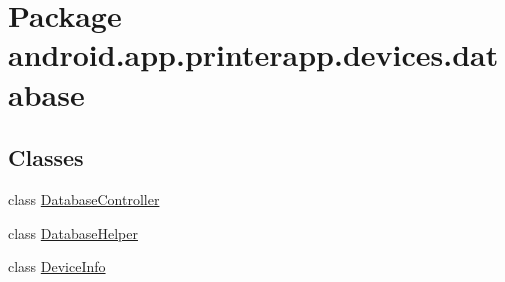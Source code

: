 \hypertarget{namespaceandroid_1_1app_1_1printerapp_1_1devices_1_1database}{}\section{Package android.\+app.\+printerapp.\+devices.\+database}
\label{namespaceandroid_1_1app_1_1printerapp_1_1devices_1_1database}
\subsection*{Classes}
\begin{DoxyCompactItemize}
\item 
class \hyperlink{classandroid_1_1app_1_1printerapp_1_1devices_1_1database_1_1_database_controller}{Database\+Controller}
\item 
class \hyperlink{classandroid_1_1app_1_1printerapp_1_1devices_1_1database_1_1_database_helper}{Database\+Helper}
\item 
class \hyperlink{classandroid_1_1app_1_1printerapp_1_1devices_1_1database_1_1_device_info}{Device\+Info}
\end{DoxyCompactItemize}
